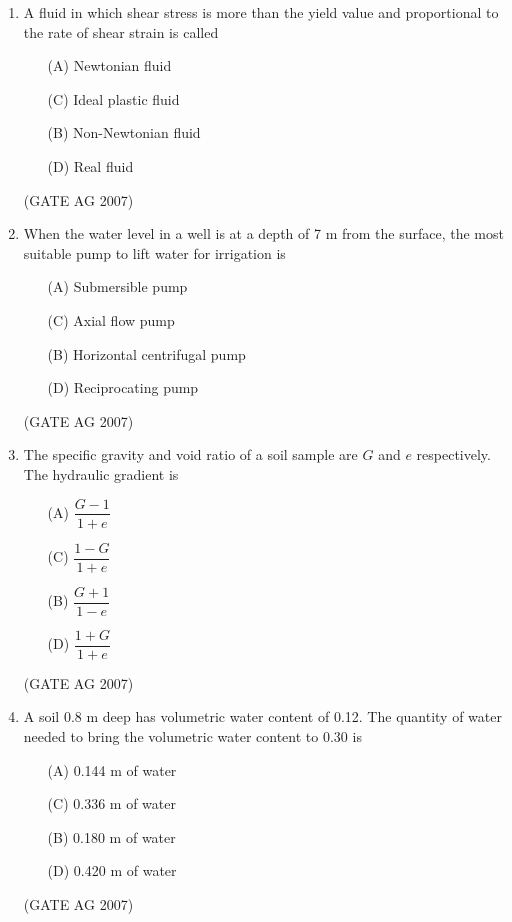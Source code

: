 \documentclass[journal,12pt,onecolumn]{IEEEtran}
\theoremstyle{remark}
\begin{document}
\begin{enumerate}[label=Q\arabic*:]
\item  A fluid in which shear stress is more than the yield value and proportional to the rate of shear strain is called
\begin{multicols}{2}
\begin{enumerate}
    \item[(A)] Newtonian fluid
     \item[(C)] Ideal plastic fluid
    \item[(B)] Non-Newtonian fluid
    \item[(D)] Real fluid
\end{enumerate}
\end{multicols}
\hfill(GATE AG 2007)


\item  When the water level in a well is at a depth of 7 m from the surface, the most suitable pump to lift water for irrigation is
\begin{multicols}{2}
\begin{enumerate}
    \item[(A)] Submersible pump
    \item[(C)] Axial flow pump
    \item[(B)] Horizontal centrifugal pump
    \item[(D)] Reciprocating pump
\end{enumerate}
\end{multicols}
\hfill(GATE AG 2007)


\item  The specific gravity and void ratio of a soil sample are $G$ and $e$ respectively. The hydraulic gradient is
\begin{multicols}{2}
\begin{enumerate}
    \item[(A)] $\dfrac{G - 1}{1 + e}$
    
    \item[(C)] $\dfrac{1 - G}{1 + e}$
    \item[(B)] $\dfrac{G + 1}{1 - e}$
    
    \item[(D)] $\dfrac{1 + G}{1 + e}$
\end{enumerate}
\end{multicols}
\hfill(GATE AG 2007)


\item  A soil 0.8 m deep has volumetric water content of 0.12. The quantity of water needed to bring the volumetric water content to 0.30 is
\begin{multicols}{2}
\begin{enumerate}
    \item[(A)] 0.144 m of water
    \item[(C)] 0.336 m of water
    \item[(B)] 0.180 m of water
    \item[(D)] 0.420 m of water
\end{enumerate}
\end{multicols}
\hfill(GATE AG 2007)


\end{enumerate}
\end{document}
